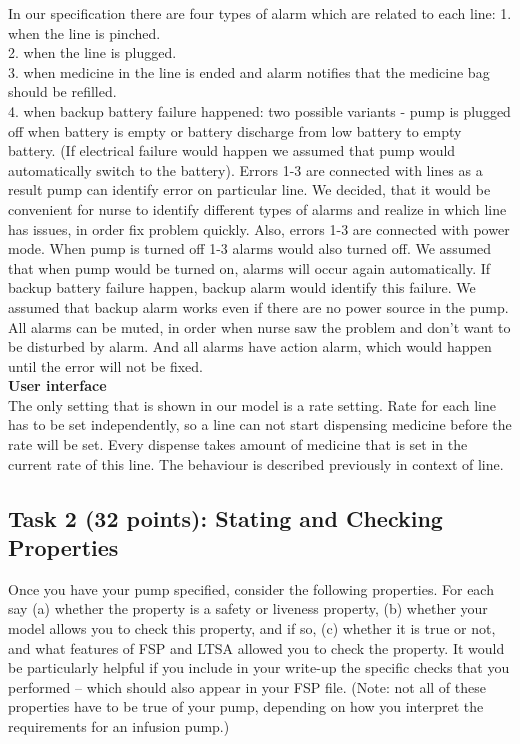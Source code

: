 \documentclass{article}
\newcommand{\head}{\subsection*}
\begin{document}
In our specification there are four types of alarm which are related to each line: 
1. when the line is pinched.\\
2. when the line is plugged.\\
3. when medicine in the line is ended and alarm notifies that the medicine bag should be refilled.\\
4. when backup battery failure happened: two possible variants - pump is plugged off when battery is empty or battery discharge from low battery to empty battery. (If electrical failure would happen we assumed that pump would automatically switch to the battery). Errors 1-3 are connected with lines as a result pump can identify error on particular line. We decided, that it would be convenient for nurse to identify different types of alarms and realize in which line has issues, in order fix problem quickly. Also, errors 1-3 are connected with power mode. When pump is turned off 1-3 alarms would also turned off. We assumed that when pump would be turned on, alarms will occur again automatically. If backup battery failure happen, backup alarm would identify this failure. We assumed that backup alarm works even if there are no power source in the pump.
All alarms can be muted, in order when nurse saw the problem and don't want to be disturbed by alarm. And all alarms have action alarm, which would happen until the error will not be fixed.\\

\textbf{User interface} \\

The only setting that is shown in our model is a rate setting. Rate for each line has to be set independently, so a line can not start dispensing medicine before the rate will be set. Every dispense takes amount of medicine that is set in the current rate of this line. The behaviour is described previously in context of line.




\head{Task 2 (32 points): Stating and Checking Properties}

Once you have your pump specified, consider the following properties. For each say (a) whether the property
is a safety or liveness property,  (b) whether your model allows you to check this property, and if
so, (c) whether it is true or not, and what features of FSP and LTSA allowed you to check the
property. It would be particularly helpful if you include in your write-up the specific checks that you performed -- which should also appear in your FSP file. (Note: not all of these properties have to be true of your pump, depending on how you interpret the requirements for an infusion pump.)
\end{document}
